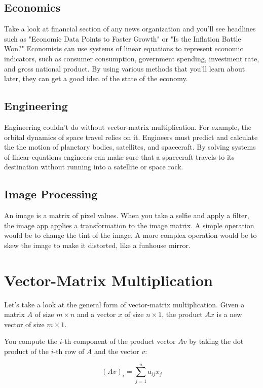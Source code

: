 \subsection{Economics}
Take a look at financial section of any news organization and you'll see headlines such as "Economic Data Points to Faster Growth" or "Is the Inflation Battle Won?" Economists can use systems of linear equations to represent economic indicators, such as consumer consumption, government spending, investment rate, and gross national product. By using various methods that you'll learn about later, they can get a good idea of the state of the economy.

\subsection{Engineering}
Engineering couldn't do without vector-matrix multiplication. For example, the orbital dynamics of space travel relies on it. Engineers must predict and calculate the the motion of planetary bodies, satellites, and spacecraft. By solving systems of linear equations engineers can make sure that a spacecraft travels to its destination without running into a satellite or space rock.

\subsection{Image Processing}
An image is a matrix of pixel values. When you take a selfie and apply a filter, the image app applies a transformation to the image matrix. A simple operation would be to change the tint of the image. A more complex operation would be to skew the image to make it distorted, like a funhouse mirror.

\section{Vector-Matrix Multiplication}
Let's take a look at the general form of vector-matrix multiplication. Given a matrix $A$ of size $m \times n$ and a vector $x$ of size $n \times 1$, the product $Ax$ is a new vector of size $m \times 1$. 

You compute the $i$-th component of the product vector $Av$ by taking the dot product of the $i$-th row of $A$ and the vector $v$:

\begin{equation*}
(Av)_i = \sum_{j=1}^n a_{ij}x_j
\end{equation*}

